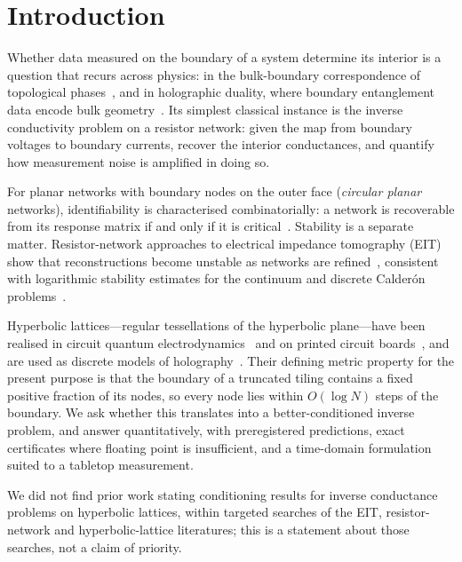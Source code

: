\documentclass[11pt,a4paper]{article}
\begin{document}
\section{Introduction}

Whether data measured on the boundary of a system determine its interior is a question that recurs across
physics: in the bulk-boundary correspondence of topological phases~\cite{KaneMele2005,HasanKane2010,SchnyderRyu2008},
and in holographic duality, where boundary entanglement data encode bulk geometry~\cite{Maldacena1998,RyuTakayanagi2006}.
Its simplest classical instance is the inverse conductivity problem on a resistor network: given the map from
boundary voltages to boundary currents, recover the interior conductances, and quantify how measurement noise is
amplified in doing so.

For planar networks with boundary nodes on the outer face (\emph{circular planar} networks), identifiability is
characterised combinatorially: a network is recoverable from its response matrix if and only if it is
critical~\cite{CurtisIngermanMorrow1998,CurtisMorrow2000,ColinDeVerdiere1994}. Stability is a separate matter.
Resistor-network approaches to electrical impedance tomography (EIT) show that reconstructions become unstable
as networks are refined~\cite{Borcea2011,BorceaCircular2010,BorceaPyramidal2010}, consistent with logarithmic
stability estimates for the continuum and discrete Calder\'on problems~\cite{ErvedozaDeGournay2011}.

Hyperbolic lattices---regular tessellations of the hyperbolic plane---have been realised in circuit quantum
electrodynamics~\cite{Kollar2019} and on printed circuit boards~\cite{Lenggenhager2022}, and are used as discrete
models of holography~\cite{Asaduzzaman2020,Basteiro2022}. Their defining metric property for the present purpose is
that the boundary of a truncated tiling contains a fixed positive fraction of its nodes, so every node lies within
$O(\log N)$ steps of the boundary. We ask whether this translates into a better-conditioned inverse problem, and
answer quantitatively, with preregistered predictions, exact certificates where floating point is insufficient,
and a time-domain formulation suited to a tabletop measurement.

We did not find prior work stating conditioning results for inverse conductance problems on hyperbolic lattices,
within targeted searches of the EIT, resistor-network and hyperbolic-lattice literatures; this is a statement about
those searches, not a claim of priority.
\end{document}

